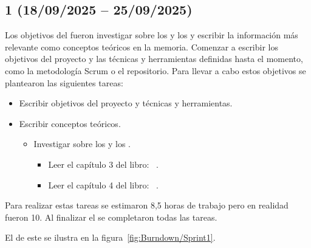 \subsection{ 1 (18/09/2025 -- 25/09/2025)}
Los objetivos del  fueron investigar sobre los  y los  y escribir la información más relevante como conceptos teóricos en la memoria. Comenzar a escribir los objetivos del proyecto y las técnicas y herramientas definidas hasta el momento, como la metodología Scrum o el repositorio. 
Para llevar a cabo estos objetivos se plantearon las siguientes tareas:
\begin{itemize}
\tightlist
	\item Escribir objetivos del proyecto y técnicas y herramientas.
	\item Escribir conceptos teóricos.
	\begin{itemize}
	\tightlist
		\item Investigar sobre los  y los .
		\begin{itemize}
		\tightlist
			\item Leer el capítulo 3 del libro: ~\cite{book:RAG_SimpleGuide}.
			\item Leer el capítulo 4 del libro: ~\cite{book:RAG_SimpleGuide}.
		\end{itemize}
	\end{itemize}
\end{itemize}

Para realizar estas tareas se estimaron 8,5 horas de trabajo pero en realidad fueron 10. Al finalizar el  se completaron todas las tareas.

El  de este  se ilustra en la figura~\ref{fig:Burndown/Sprint1}.

